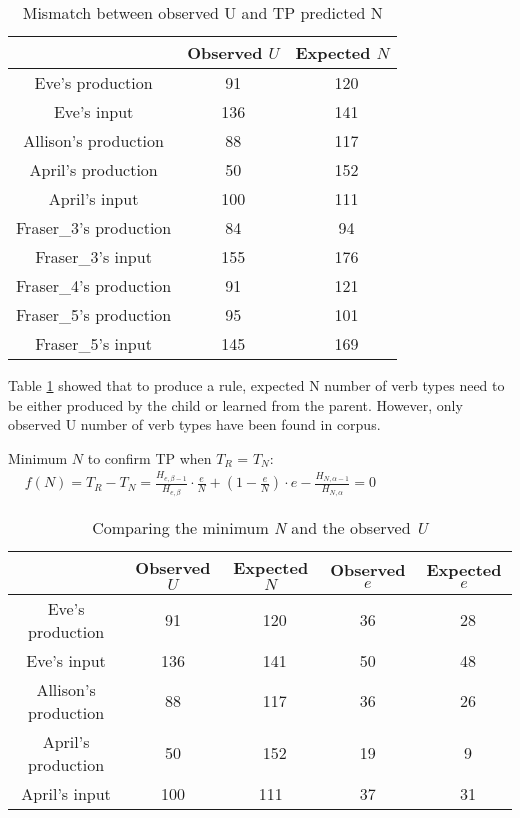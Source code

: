 \begin{table}[htb]
\centering

\caption{Mismatch between observed U and TP predicted N}
\label{table:MISMATCH}
\begin{tabular}{ccc}
\toprule
 & Observed $U$ & Expected $N$ \\
 \hline
Eve's production & 91 & ~120 \\
Eve's input & 136 & ~141 \\
Allison's production & 88 & ~117\\
April's production & 50 & ~152\\
April's input & 100 & ~111 \\
\bottomrule
\bottomrule
Fraser_3's production & 84 & ~94 \\
Fraser_3's input & 155 & ~176\\
Fraser_4's production & 91 & ~121 \\
Fraser_5's production & 95 & ~101\\
Fraser_5's input & 145 & ~169\\
\bottomrule
\end{tabular}
\end{table}

Table \ref{table:MISMATCH} showed that to produce a rule, expected N number of verb types need to be either produced by the child or learned from the parent. However, only observed U number of verb types have been found in corpus.  

\begin{exe}
\ex \label{eveagain}Minimum $N$ to confirm TP when $T_R$ = $T_N$:\\
$\begin{aligned}
& f(N) = T_R - T_N =
\frac{H_{e,\beta-1}}{H_{e,\beta}}\cdot\frac{e}{N} + (1-\frac{e}{N})\cdot e - \frac{H_{N,\alpha-1}}{H_{N,\alpha}} = 0
\end{aligned}$

\end{exe}
\begin{table}[!h]
\centering
\label{table:eoi}
\caption{Comparing the minimum \textit{N} and the observed \textit{U}}

\begin{tabular}{ccc|cc}
\toprule
 & Observed $U$ & Expected $N$ & Observed $e$ & Expected $e$\\
 \hline
Eve's production & 91 & ~120 & 36& ~28\\
Eve's input & 136 & ~141 & 50 & ~48 \\
Allison's production & 88 & ~117 & 36 & ~26 \\
April's production & 50 & ~152 & 19 & ~9\\
April's input & 100 & 111 & 37 &~31\\
\bottomrule
\end{tabular}
\end{table}
